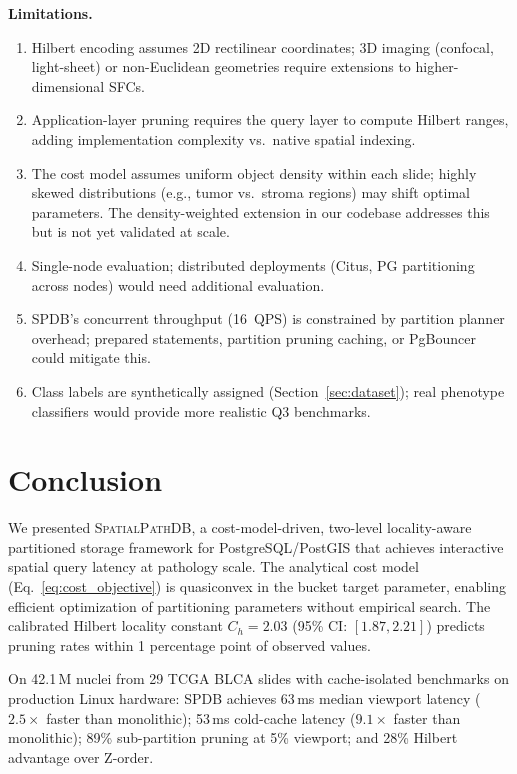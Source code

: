 \documentclass[sigconf]{acmart}
\begin{document}
\textbf{Limitations.}
\begin{enumerate}
\item Hilbert encoding assumes 2D rectilinear coordinates; 3D imaging (confocal, light-sheet) or non-Euclidean geometries require extensions to higher-dimensional SFCs.
\item Application-layer pruning requires the query layer to compute Hilbert ranges, adding implementation complexity vs.\ native spatial indexing.
\item The cost model assumes uniform object density within each slide; highly skewed distributions (e.g., tumor vs.\ stroma regions) may shift optimal parameters.
The density-weighted extension in our codebase addresses this but is not yet validated at scale.
\item Single-node evaluation; distributed deployments (Citus, PG partitioning across nodes) would need additional evaluation.
\item SPDB's concurrent throughput (16~QPS) is constrained by partition planner overhead; prepared statements, partition pruning caching, or PgBouncer could mitigate this.
\item Class labels are synthetically assigned (Section~\ref{sec:dataset}); real phenotype classifiers would provide more realistic Q3 benchmarks.
\end{enumerate}

\section{Conclusion}
\label{sec:conclusion}

We presented \textsc{SpatialPathDB}, a cost-model-driven, two-level locality-aware partitioned storage framework for PostgreSQL/PostGIS that achieves interactive spatial query latency at pathology scale.
The analytical cost model (Eq.~\ref{eq:cost_objective}) is quasiconvex in the bucket target parameter, enabling efficient optimization of partitioning parameters without empirical search.
The calibrated Hilbert locality constant $C_h = 2.03$ (95\% CI: $[1.87, 2.21]$) predicts pruning rates within 1 percentage point of observed values.

On 42.1\,M nuclei from 29 TCGA BLCA slides with cache-isolated benchmarks on production Linux hardware:
SPDB achieves 63\,ms median viewport latency ($2.5\times$ faster than monolithic);
53\,ms cold-cache latency ($9.1\times$ faster than monolithic);
89\% sub-partition pruning at 5\% viewport;
and 28\% Hilbert advantage over Z-order.
\end{document}
